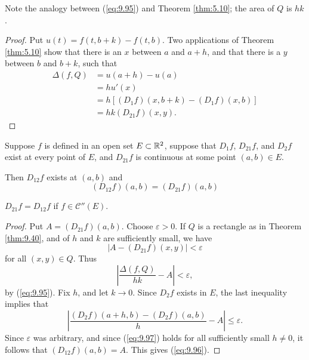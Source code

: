 Note the analogy between (\ref{eq:9.95}) and Theorem \ref{thm:5.10};
the area of $Q$ is $hk$.

\begin{proof}
    Put $u(t) = f(t, b+k) - f(t, b)$.
    Two applications of Theorem \ref{thm:5.10} show that
    there is an $x$ between $a$ and $a+h$,
    and that there is a $y$ between $b$ and $b+k$,
    such that
    \begin{align*}
        \Delta(f, Q)
         & = u(a+h) - u(a)                                    \\
         & = h u'(x)                                          \\
         & = h \left[ (D_1 f)(x, b+k) - (D_1 f)(x, b) \right] \\
         & = hk (D_{21} f)(x, y) .
    \end{align*}
\end{proof}

\begin{thm}
    \label{thm:9.41}
    Suppose $f$ is defined in an open set $E \subset {\protect\mathbb R}^2$,
    suppose that $D_1 f$, $D_{21} f$, and $D_2 f$ exist at every point of $E$,
    and $D_{21} f$ is continuous at some point $(a,b) \in E$.

    Then $D_{12} f$ exists at $(a,b)$ and
    \begin{equation}
        \label{eq:9.96}
        (D_{12} f)(a,b) =
        (D_{21} f)(a,b)
    \end{equation}
\end{thm}

\begin{myCorollary*}
    $D_{21} f = D_{12} f$ if $f \in \mathscr{C}''(E)$.
\end{myCorollary*}

\begin{proof}
    Put $A = (D_{21} f)(a,b)$.
    Choose $\varepsilon > 0$.
    If $Q$ is a rectangle as in Theorem \ref{thm:9.40},
    and of $h$ and $k$ are sufficiently small, we have
    \begin{equation*}
        \left| A - (D_{21} f)(x,y) \right| < \varepsilon
    \end{equation*}
    for all $(x,y) \in Q$.
    Thus
    \begin{equation*}
        \left| \frac{\Delta (f, Q)}{hk} - A \right| < \varepsilon ,
    \end{equation*}
    by (\ref{eq:9.95}).
    Fix $h$, and let $k \rightarrow 0$.
    Since $D_{2} f$ exists in $E$, the last inequality implies that
    \begin{equation}
        \label{eq:9.97}
        \left|
        \frac{(D_2 f)(a+h,b) - (D_2 f)(a,b)}{h} - A
        \right| \leq \varepsilon .
    \end{equation}
    Since $\varepsilon$ was arbitrary,
    and since (\ref{eq:9.97}) holds for all sufficiently small $h \neq 0$,
    it follows that $(D_{12} f)(a, b) = A$.
    This gives (\ref{eq:9.96}).
\end{proof}
